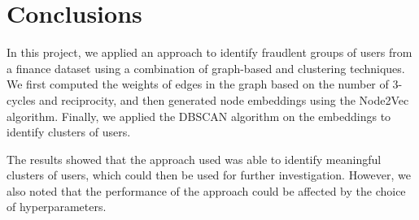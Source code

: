 \documentclass[12pt,a4paper]{article}
\begin{document}
\section{Conclusions}
In this project, we applied an approach to identify fraudlent groups of users from a finance dataset using a combination of graph-based and clustering techniques. We first computed the weights of edges in the graph based on the number of 3-cycles and reciprocity, and then generated node embeddings using the Node2Vec algorithm. Finally, we applied the DBSCAN algorithm on the embeddings to identify clusters of users.

The results showed that the approach used was able to identify meaningful clusters of users, which could then be used for further investigation. However, we also noted that the performance of the approach could be affected by the choice of hyperparameters.
\end{document}

